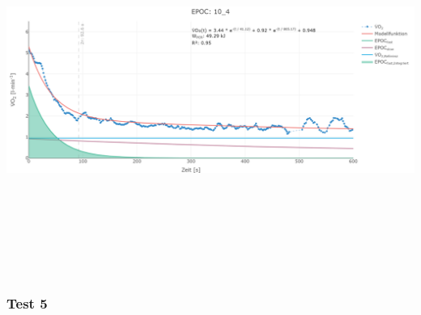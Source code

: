 \documentclass[
  letterpaper,
  DIV=11]{scrartcl}
\begin{document}
\includegraphics[width=11.45833in,height=4.6875in]{images/10_4.png}

\subsubsection{Test 5}
\end{document}
